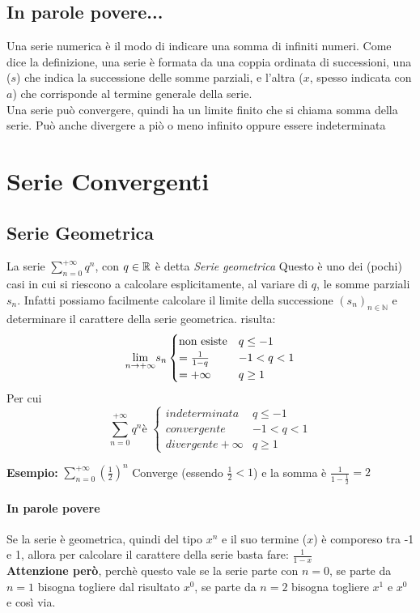\documentclass[12pt, a4paper, openany]{book}
\newcommand{\esempio}[1]{\begin{box_esempio} \textbf{Esempio: }#1\end{box_esempio}}
\begin{document}
\subsection*{In parole povere...}
Una serie numerica è il modo di indicare una somma di infiniti numeri.
Come dice la definizione, una serie è formata da una coppia ordinata di successioni, una ($s$) che indica la successione delle somme parziali, e l'altra ($x$, spesso indicata con $a$) che corrisponde al termine generale della serie.
\\Una serie può convergere, quindi ha un limite finito che si chiama somma della serie. Può anche divergere a piò o meno infinito oppure essere indeterminata


\section{Serie Convergenti}
\subsection{Serie Geometrica}
La serie $\sum_{n=0}^{+\infty} q^n$, con $q \in \mathbb{R}$ è detta \emph{Serie geometrica}
Questo è uno dei (pochi) casi in cui si riescono a calcolare esplicitamente, al variare di $q$, le somme parziali $s_n$.
Infatti possiamo facilmente calcolare il limite della successione $(s_n)_{n\in \mathbb{N}}$ e determinare il carattere della serie geometrica. 
risulta:
\begin{equation}
    \underset{n \to +\infty}{\lim} s_n \begin{cases}
        \text{non esiste} & q \leq -1 \\
        = \frac{1}{1-q} & -1 < q < 1 \\
        = +\infty & q \geq 1
    \end{cases}
\end{equation}
Per cui 
\begin{equation}
    \sum_{n=0}^{+\infty} q^n \text{è } \begin{cases}
        indeterminata & q \leq -1 \\
        convergente & -1 < q < 1 \\
        divergente +\infty & q \geq 1
    \end{cases}
\end{equation}

\esempio{
    $\sum_{n=0}^{+\infty} (\frac{1}{2})^n$ Converge (essendo $\frac{1}{2} < 1$) e la somma è $\frac{1}{1-\frac{1}{2}} = 2$ 
}

\paragraph{In parole povere}
Se la serie è geometrica, quindi del tipo $x^n$ e il suo termine ($x$) è comporeso tra -1 e 1, allora per calcolare il carattere della serie basta fare: $\frac{1}{1-x}$
\\ \textbf{Attenzione però}, perchè questo vale se la serie parte con $n=0$, se parte da $n=1$ bisogna togliere dal risultato $x^0$, se parte da $n=2$ bisogna togliere $x^1$ e $x^0$ e così via.
\end{document}
